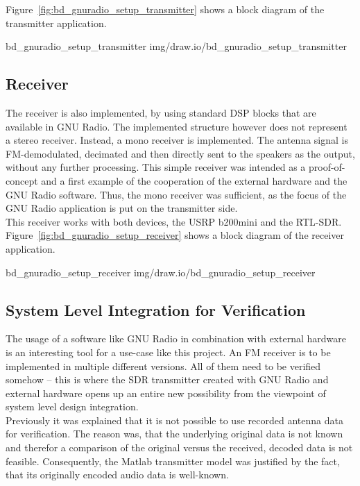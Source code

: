 \noindent
Figure~\ref{fig:bd_gnuradio_setup_transmitter} shows a block diagram of the transmitter application.

 {bd_gnuradio_setup_transmitter} {img/draw.io/bd_gnuradio_setup_transmitter}


\subsection{Receiver}

The receiver is also implemented, by using standard DSP blocks that are available in GNU Radio.
The implemented structure however does not represent a stereo receiver.
Instead, a mono receiver is implemented.
The antenna signal is FM-demodulated, decimated and then directly sent to the speakers as the output, without any further processing.
This simple receiver was intended as a proof-of-concept and a first example of the cooperation of the external hardware and the GNU Radio software.
Thus, the mono receiver was sufficient, as the focus of the GNU Radio application is put on the transmitter side.\\

This receiver works with both devices, the USRP b200mini and the RTL-SDR.
Figure~\ref{fig:bd_gnuradio_setup_receiver} shows a block diagram of the receiver application.

 {bd_gnuradio_setup_receiver} {img/draw.io/bd_gnuradio_setup_receiver}

\subsection{System Level Integration for Verification}

The usage of a software like GNU Radio in combination with external hardware is an interesting tool for a use-case like this project.
An FM receiver is to be implemented in multiple different versions.
All of them need to be verified somehow -- this is where the SDR transmitter created with GNU Radio and external hardware opens up an entire new possibility from the viewpoint of system level design integration.\\

Previously it was explained that it is not possible to use recorded antenna data for verification.
The reason was, that the underlying original data is not known and therefor a comparison of the original versus the received, decoded data is not feasible.
Consequently, the Matlab transmitter model was justified by the fact, that its originally encoded audio data is well-known.\\

